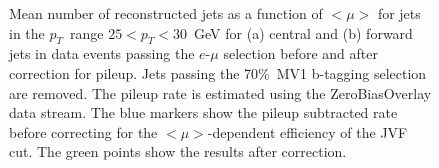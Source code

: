 \begin{figure}

\caption{Mean number of reconstructed jets as a function of $<\mu>$ 
for jets in the $p_T$~range $25<p_T<30$~GeV for (a) central and (b) forward jets
in data events passing the $e$-$\mu$ selection before and after correction for pileup.
Jets passing the 70\%\  MV1 b-tagging selection are removed.
The pileup rate is estimated using the ZeroBiasOverlay data stream.
The blue markers show the pileup subtracted rate before correcting
for the $<\mu>$-dependent efficiency of the JVF cut.  The green
points show the results after correction.}
\label{fig:pileupjets}
\end{figure}

